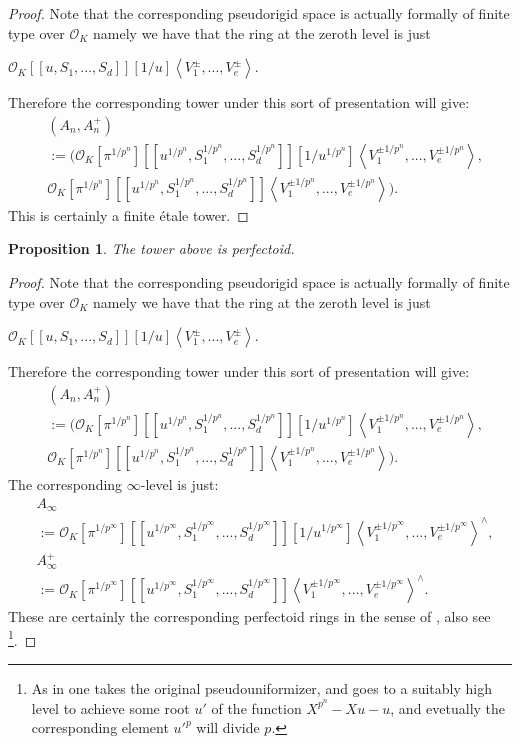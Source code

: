 \documentclass[11pt]{book}
\newtheorem{proposition}[theorem]{Proposition}
\theoremstyle{definition}
\numberwithin{equation}{section}
\begin{document}
\begin{proof}
Note that the corresponding pseudorigid space is actually formally of finite type over $\mathcal{O}_K$ namely we have that the ring at the zeroth level is just
\begin{center}
 $\mathcal{O}_K[[u,S_1,...,S_d]][1/u]\left<V_1^{\pm},...,V_e^{\pm}\right>$. 
\end{center} 
Therefore the corresponding tower under this sort of presentation will give:
\begin{align}
&(A_n,A_n^+)\\
&:=(\mathcal{O}_K[\pi^{1/p^n}][[u^{1/p^n},S_1^{1/p^n},...,S_d^{1/p^n}]][1/u^{1/p^n}]\left<V_1^{\pm 1/p^n},...,V_e^{\pm 1/p^n}\right>,\\
&\mathcal{O}_K[\pi^{1/p^n}][[u^{1/p^n},S_1^{1/p^n},...,S_d^{1/p^n}]]\left<V_1^{\pm 1/p^n},...,V_e^{\pm 1/p^n}\right>).
\end{align}	
This is certainly a finite \'etale tower.
\end{proof}

 
\begin{proposition}
The tower above is perfectoid.	
\end{proposition}

\begin{proof}
Note that the corresponding pseudorigid space is actually formally of finite type over $\mathcal{O}_K$ namely we have that the ring at the zeroth level is just
\begin{center}
 $\mathcal{O}_K[[u,S_1,...,S_d]][1/u]\left<V_1^{\pm},...,V_e^{\pm}\right>$.	
\end{center}
Therefore the corresponding tower under this sort of presentation will give:
\begin{align}
&(A_n,A_n^+)\\
&:=(\mathcal{O}_K[\pi^{1/p^n}][[u^{1/p^n},S_1^{1/p^n},...,S_d^{1/p^n}]][1/u^{1/p^n}]\left<V_1^{\pm 1/p^n},...,V_e^{\pm 1/p^n}\right>,\\
&\mathcal{O}_K[\pi^{1/p^n}][[u^{1/p^n},S_1^{1/p^n},...,S_d^{1/p^n}]]\left<V_1^{\pm 1/p^n},...,V_e^{\pm 1/p^n}\right>).
\end{align}	
The corresponding $\infty$-level is just:
\begin{align}
&A_\infty\\
&:=\mathcal{O}_K[\pi^{1/p^\infty}][[u^{1/p^\infty},S_1^{1/p^\infty},...,S_d^{1/p^\infty}]][1/u^{1/p^\infty}]\left<V_1^{\pm 1/p^\infty},...,V_e^{\pm 1/p^\infty}\right>^\wedge,\\
&A_\infty^+\\
&:=\mathcal{O}_K[\pi^{1/p^\infty}][[u^{1/p^\infty},S_1^{1/p^\infty},...,S_d^{1/p^\infty}]]\left<V_1^{\pm 1/p^\infty},...,V_e^{\pm 1/p^\infty}\right>^\wedge.
\end{align}
These are certainly the corresponding perfectoid rings in the sense of \cite[Definition 3.3.1]{12KL2}, also see \cite[Lemma 3.3.28]{12KL2}\footnote{As in \cite[Lemma 3.3.28]{12KL2} one takes the original pseudouniformizer, and goes to a suitably high level to achieve some root $u'$ of the function $X^{p^n}-Xu-u$, and evetually the corresponding element $u'^p$ will divide $p$.}.
\end{proof}
\end{document}
